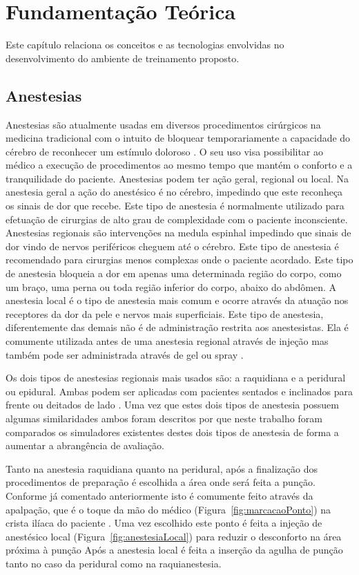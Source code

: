 \chapter{Fundamentação Teórica} \label{cap:cap2}

Este capítulo relaciona os conceitos e as tecnologias envolvidas no desenvolvimento do ambiente de treinamento proposto. 

\section{Anestesias}

Anestesias são atualmente usadas em diversos procedimentos cirúrgicos na medicina tradicional com o intuito de bloquear temporariamente a capacidade do cérebro de reconhecer um estímulo doloroso \cite{Raj1988}. O seu uso visa possibilitar ao médico a execução de procedimentos ao mesmo tempo que mantém o conforto e a tranquilidade do paciente. Anestesias podem ter ação geral, regional ou local. Na anestesia geral a ação do anestésico é no cérebro, impedindo que este reconheça os sinais de dor que recebe. Este tipo de anestesia é normalmente utilizado para efetuação de cirurgias de alto grau de complexidade com o paciente inconsciente. Anestesias regionais são intervenções na medula espinhal impedindo que sinais de dor vindo de nervos periféricos cheguem até o cérebro. Este tipo de anestesia é recomendado para cirurgias menos complexas onde o paciente acordado. Este tipo de anestesia bloqueia a dor em apenas uma determinada região do corpo, como um braço, uma perna ou toda região inferior do corpo, abaixo do abdômen. A anestesia local é o tipo de anestesia mais comum e ocorre através da atuação nos receptores da dor da pele e nervos mais superficiais. Este tipo de anestesia, diferentemente das demais não é de administração restrita aos anestesistas. Ela é comumente utilizada antes de uma anestesia regional através de injeção mas também pode ser administrada através de gel ou spray \cite{Miller2009}.

Os dois tipos de anestesias regionais mais usados são: a raquidiana e a peridural ou epidural. Ambas podem ser aplicadas com pacientes sentados e inclinados para frente ou deitados de lado \cite{Raj1988}. Uma vez que estes dois tipos de anestesia possuem algumas similaridades ambos foram descritos por que neste trabalho foram comparados os simuladores existentes destes dois tipos de anestesia de forma a aumentar a abrangência de avaliação.  

Tanto na anestesia raquidiana quanto na peridural, após a finalização dos procedimentos de preparação é escolhida a área onde será feita a punção. Conforme já comentado anteriormente isto é comumente feito através da apalpação, que é o toque da mão do médico (Figura~\ref{fig:marcacaoPonto}) na crista ilíaca do paciente \cite{Helayel2010,Isaacs2015}. Uma vez escolhido este ponto é feita a injeção de anestésico local (Figura~\ref{fig:anestesiaLocal}) para reduzir o desconforto na área próxima à punção \cite{Sedicias2018} Após a anestesia local é feita a inserção da agulha de punção tanto no caso da peridural como na raquianestesia.

